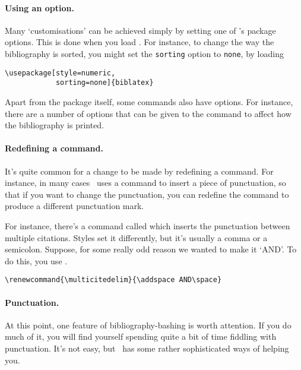\paragraph{Using an option.}
Many `customisations' can be achieved simply by setting one of
\biblatex's package options. This is done when you load \biblatex. For
instance, to change the way the bibliography is sorted, you might set
the \verb|sorting| option to \verb|none|, by loading
\begin{verbatim}
\usepackage[style=numeric,
            sorting=none]{biblatex}
\end{verbatim}

Apart from the package itself, some commands also have options. For
instance, there are a number of options that can be given to the
command to affect how the bibliography is printed.

\paragraph{Redefining a command.} It's quite common for a change to be
made by redefining a command. For instance, in many cases \biblatex\
uses a command to insert a piece of punctuation, so that if you want
to change the punctuation,\intref{See p~\pageref{sec:punctuation}}
you can redefine the command to produce a different punctuation mark.

For instance, there's a command called  which
inserts the punctuation between multiple citations. Styles set it
differently, but it's usually a comma or a semicolon. Suppose, for
some really odd reason we wanted to make it `AND'. To do this, you use
\cs{renewcommand}.
\begin{verbatim}
\renewcommand{\multicitedelim}{\addspace AND\space}
\end{verbatim}

\paragraph{Punctuation.} At this point, one feature of
bibliography-bashing is worth attention. If you do much of it, you
will find yourself spending quite a bit of time fiddling with
punctuation. It's not easy, but \biblatex\ has some rather
sophisticated ways of helping you.

